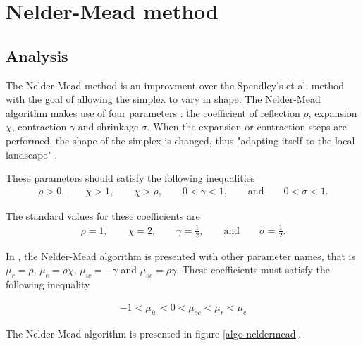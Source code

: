 \chapter{Nelder-Mead method}

\section{Analysis}

The Nelder-Mead method is an improvment over the Spendley's et al.
method with the goal of allowing the simplex to vary in shape.
The Nelder-Mead algorithm makes use of four parameters : the 
coefficient of reflection $\rho$, expansion $\chi$, 
contraction $\gamma$ and shrinkage $\sigma$.
When the expansion or contraction steps are performed, the shape 
of the simplex is changed, thus "adapting itself to the 
local landscape" \cite{citeulike:3009487}.

These parameters should satisfy the following inequalities \cite{citeulike:3009487,lagarias:112}
\begin{eqnarray}
\label{condition-coeffs}
\rho>0, \qquad \chi > 1, \qquad \chi > \rho, \qquad 0<\gamma<1, \qquad \textrm{and} \qquad 0<\sigma<1.
\end{eqnarray}

The standard values for these coefficients are 
\begin{eqnarray}
\label{standard-coeffs}
\rho=1, \qquad \chi =2, \qquad \gamma=\frac{1}{2}, \qquad \textrm{and} \qquad \sigma=\frac{1}{2}.
\end{eqnarray}

In \cite{Kelley1999}, the Nelder-Mead algorithm is presented with 
other parameter names, that is $\mu_r = \rho$, $\mu_e = \rho\chi$, $\mu_{ic} = -\gamma$
and $\mu_{oc} = \rho\gamma$. These coefficients must satisfy the following 
inequality 

\begin{eqnarray}
-1 < \mu_{ic} < 0 < \mu_{oc} < \mu_r < \mu_e
\end{eqnarray}

The Nelder-Mead algorithm is presented in figure \ref{algo-neldermead}.

